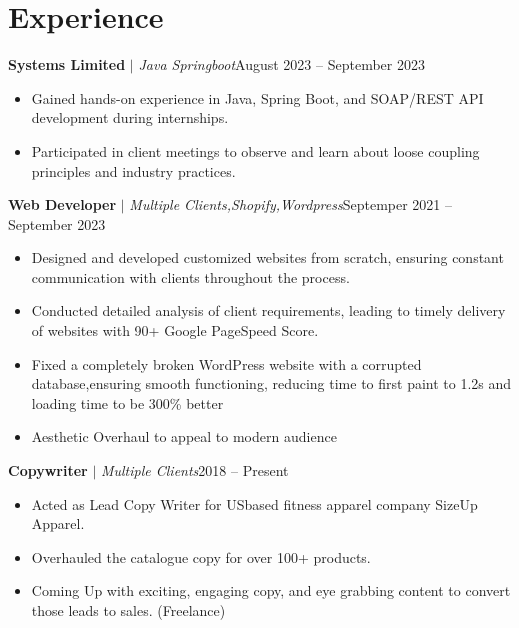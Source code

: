 
\section{Experience}
  \resumeSubHeadingListStart

          \resumeProjectHeading
          {\textbf{Systems Limited} $|$ \footnotesize\emph{Java Springboot}\vspace{8pt}}{August 2023 -- September 2023}
            \begin{itemize}
                \item Gained hands-on experience in Java, Spring Boot, and SOAP/REST API development during internships.
                \item 
                Participated in client meetings to observe and learn about loose coupling principles and industry practices.
            \end{itemize}
          
          \resumeProjectHeading
          {\textbf{Web Developer}\vspace{8pt} $|$ \footnotesize\emph{Multiple Clients,Shopify,Wordpress}}{Septemper 2021 -- September 2023}
            \begin{itemize}
              \item 
              Designed and developed customized websites from scratch, ensuring constant communication with clients throughout the process.
              \item 
              Conducted detailed analysis of client requirements, leading to timely delivery of websites with 90+ Google PageSpeed Score.  
              \item 
               Fixed a completely broken WordPress website with a corrupted database,ensuring smooth functioning, reducing time to first paint to 1.2s and loading time to be 300\% better
              \item 
              Aesthetic Overhaul to appeal to modern audience
          \end{itemize}

          \resumeProjectHeading
          {\textbf{Copywriter} $|$ \footnotesize\emph{Multiple Clients}\vspace{8pt}}{2018 -- Present}
          {\small{}}
          \begin{itemize}
              \item
              Acted as Lead Copy Writer for USbased fitness apparel company SizeUp Apparel.
              \item 
              Overhauled the catalogue copy for over 100+ products.
              \item
               Coming Up with exciting, engaging copy, and eye grabbing content to convert those leads to sales. (Freelance)
              
              
          \end{itemize}

    \resumeSubHeadingListEnd 